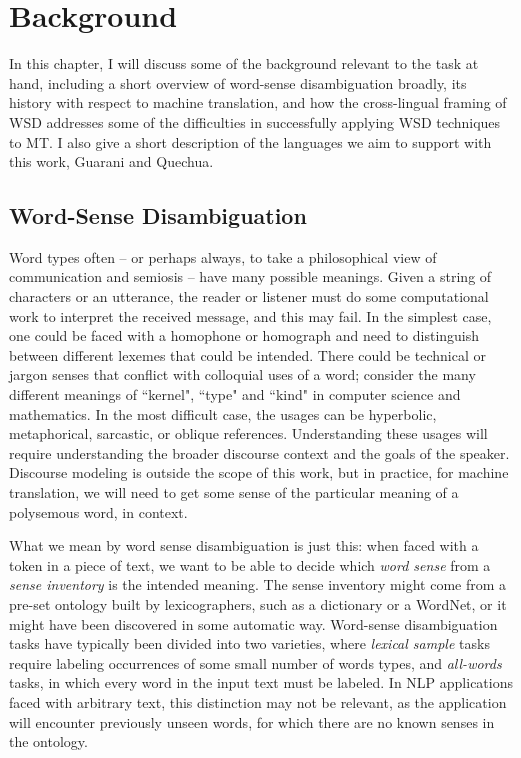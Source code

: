 \chapter{Background}
\label{chap:background}

In this chapter, I will discuss some of the background relevant to the task at
hand, including a short overview of word-sense disambiguation broadly, its
history with respect to machine translation, and how the cross-lingual framing
of WSD addresses some of the difficulties in successfully applying WSD
techniques to MT. I also give a short description of the languages we aim to
support with this work, Guarani and Quechua.

\section{Word-Sense Disambiguation}
Word types often -- or perhaps always, to take a philosophical view of 
communication and semiosis -- have many possible meanings. Given a string of
characters or an utterance, the reader or listener must do some computational
work to interpret the received message, and this may fail.
In the simplest case, one could be faced with
a homophone or homograph and need to distinguish between different lexemes that
could be intended. There could be technical or jargon senses that conflict with
colloquial uses of a word; consider the many different meanings of ``kernel",
``type" and ``kind" in computer science and mathematics. In the most difficult
case, the usages can be hyperbolic, metaphorical, sarcastic, or oblique
references. Understanding these usages will require understanding the broader
discourse context and the goals of the speaker. Discourse modeling is outside
the scope of this work, but in practice, for machine translation, we will need
to get some sense of the particular meaning of a polysemous word, in context.

What we mean by word sense disambiguation is just this:
when faced with a token in a piece of text, we want to be able to
decide which \emph{word sense} from a \emph{sense inventory} is the intended
meaning. The sense inventory might come from a pre-set ontology built by
lexicographers, such as a
dictionary or a WordNet, or it might have  been discovered in some automatic
way. Word-sense disambiguation tasks have typically been divided into two
varieties, where \emph{lexical sample} tasks require labeling occurrences of
some small number of words types, and \emph{all-words} tasks, in which every
word in the input text must be labeled. In NLP applications faced with
arbitrary text, this distinction may not be relevant, as the application will
encounter previously unseen words, for which there are no known senses in the
ontology.

